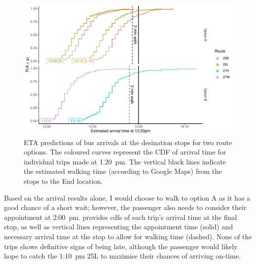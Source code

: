 \begin{knitrout}\small
{}\color{fgcolor}\begin{figure}

{\centering \includegraphics[width=\textwidth]{figure/eta_journey_arriveby-1} 

}

\caption[ETA predictions of bus arrivals at the desination stops for two route options]{ETA predictions of bus arrivals at the desination stops for two route options. The coloured curves represent the CDF of arrival time for individual trips made at 1.20~pm. The vertical black lines indicate the estimated walking time (according to Google Maps) from the stops to the End location.}\label{fig:eta_journey_arriveby}
\end{figure}


\end{knitrout}

Based on the arrival results alone, I would choose to walk to option A as it has a good chance of a short wait; however, the passenger also needs to consider their appointment at  2:00~pm.  provides \glspl{cdf} of each trip's arrival time at the final stop, as well as vertical lines representing the appointment time (solid) and necessary arrival time at the stop to allow for walking time (dashed). None of the trips shows definitive signs of being late, although the passenger would likely hope to catch the 1:10~pm 25L to maximise their chances of arriving on-time.


